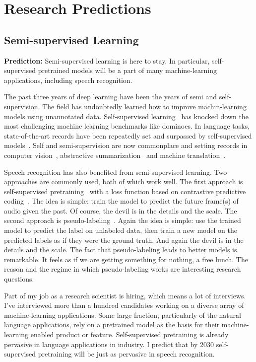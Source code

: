 \section{Research Predictions}
\label{sec:research_predictions}

\subsection{Semi-supervised Learning}

{\bf Prediction:} Semi-supervised learning is here to stay. In particular,
self-supervised pretrained models will be a part of many machine-learning
applications, including speech recognition.

The past three years of deep learning have been the years of semi and
self-supervision. The field has undoubtedly learned how to improve
machin-learning models using unannotated data. Self-supervised
learning~\cite{lecun2021self} has knocked down the most challenging machine
learning benchmarks like dominoes. In language tasks, state-of-the-art records
have been repeatedly set and surpassed by self-supervised
models~\citep{devlin2019bert, radford2019language, yang2019xlnet}. Self and
semi-supervision are now commonplace and setting records in computer
vision~\citep{he2020momentum, chen2020simple, grill2020bootstrap}, abstractive
summarization~\citep{zhang2020pegasus} and
machine translation~\citep{sennrich2016improving}.

Speech recognition has also benefited from semi-supervised learning. Two
approaches are commonly used, both of which work well. The first approach is
self-supervised pretraining~\citep{schneider2019wav2vec, zhang2020pushing} with
a loss function based on contrastive predictive
coding~\citep{oord2018representation}. The idea is simple: train the model to
predict the future frame(s) of audio given the past. Of course, the devil is in
the details and the scale. The second approach is
pseudo-labeling~\citep{lee2013pseudo, kahn2020self, xu2020iterative}. Again the
idea is simple: use the trained model to predict the label on unlabeled data,
then train a new model on the predicted labels as if they were the ground
truth. And again the devil is in the details and the scale. The fact
that pseudo-labeling leads to better models is remarkable. It feels as if we
are getting something for nothing, a free lunch. The reason and the regime in
which pseudo-labeling works are interesting research questions.

Part of my job as a research scientist is hiring, which means a lot of
interviews. I've interviewed more than a hundred candidates working on a
diverse array of machine-learning applications. Some large fraction,
particularly of the natural language applications, rely on a pretrained model
as the basis for their machine-learning enabled product or feature.
Self-supervised pretraining is already pervasive in language applications in
industry. I predict that by 2030 self-supervised pretraining will be just as
pervasive in speech recognition.

